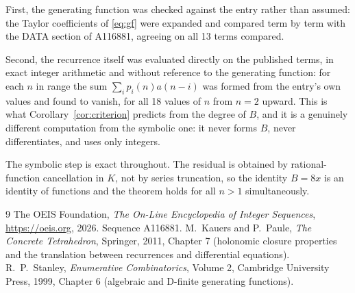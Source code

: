 \documentclass[11pt,a4paper]{article}
\theoremstyle{plain}
\theoremstyle{definition}
\begin{document}
First, the generating function was checked against the entry rather than assumed: the
Taylor coefficients of \eqref{eq:gf} were expanded and compared term by term with the DATA
section of A116881, agreeing on all 13 terms compared.

Second, the recurrence itself was evaluated directly on the published terms, in exact
integer arithmetic and without reference to the generating function: for each $n$ in range
the sum $\sum_{i}p_{i}(n)a(n-i)$ was formed from the entry's own values and found to
vanish, for all 18 values of $n$ from $n=2$ upward. This is what
Corollary~\ref{cor:criterion} predicts from the degree of $B$, and it is a genuinely
different computation from the symbolic one: it never forms $B$, never differentiates, and
uses only integers.

The symbolic step is exact throughout. The residual is obtained by rational-function
cancellation in $K$, not by series truncation, so the identity $B=8 x$ is an
identity of functions and the theorem holds for all $n>1$ simultaneously.

\begin{thebibliography}{9}
 The OEIS Foundation, \emph{The On-Line Encyclopedia of Integer Sequences},
\url{https://oeis.org}, 2026. Sequence A116881.
 M.~Kauers and P.~Paule, \emph{The Concrete Tetrahedron}, Springer, 2011,
Chapter 7 (holonomic closure properties and the translation between recurrences and
differential equations).
 R.~P.~Stanley, \emph{Enumerative Combinatorics}, Volume 2, Cambridge
University Press, 1999, Chapter 6 (algebraic and D-finite generating functions).
\end{thebibliography}
\end{document}
